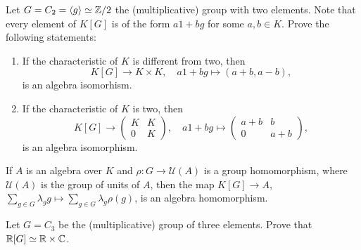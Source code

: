 \begin{exercise}
	Let $G=C_2=\langle g\rangle\simeq\mathbb{Z}/2$ the (multiplicative) 
	group with two elements. Note that every element of $K[G]$ is of the form
	$a1+bg$ for some $a,b\in K$. Prove the following statements:
	\begin{enumerate}
	    \item If the characteristic of $K$ is different from two, then 
	    \[
		K[G]\to K\times K,
		\quad
		a1+bg\mapsto (a+b,a-b),
	\]
	is an algebra isomorhism. 
	\item If the characteristic of $K$ is two, then 
	\[
	K[G]\to \begin{pmatrix}
			K & K\\
			0 & K
		\end{pmatrix},
		\quad
		a1+bg\mapsto\begin{pmatrix}
			a+b & b\\
			0 & a+b
		\end{pmatrix},
	\]
	is an algebra isomorphism. 
	\end{enumerate}
\end{exercise}

If $A$ is an algebra over $K$ and $\rho\colon G\to \mathcal{U}(A)$
is a group homomorphism, where $\mathcal{U}(A)$ is the group of units of $A$, then 
the map $K[G]\to A$,
$\sum_{g\in G}\lambda_gg\mapsto\sum_{g\in G}\lambda_g\rho(g)$, is an algebra homomorphism. 

\begin{exercise}
	Let $G=C_3$ be the (multiplicative) group of three elements. Prove that
	$\mathbb{R}[G]\simeq\mathbb{R}\times\mathbb{C}$.
\end{exercise}

